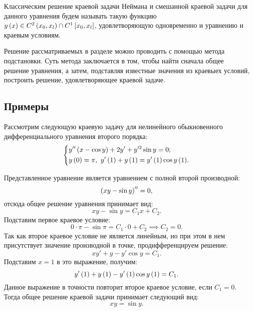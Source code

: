 	Классическим решение краевой задачи Неймана и смешанной краевой задачи для данного уравнения будем называть такую функцию $y \left( x \right) \in C^{2} \left( x_0, x_l \right) \cap C^{1} \left[ x_0, x_l \right]$, удовлетворяющую одновременно и уравнению и краевым условиям.

	Решение рассматриваемых в разделе можно проводить с помощью метода подстановки. Суть метода заключается в том, чтобы найти сначала общее решение уравнения, а затем, подставляя известные значения из краевыех условий, построить решение, удовлетворяющее краевой задаче.

	\subsection{Примеры}

		Рассмотрим следующую краевую задачу для нелинейного обыкновенного дифференциального уравнения второго порядка:
		\[ \left\lbrace \begin{aligned} 
			&y'' \left( x - \cos{y} \right) + 2y' + y'^2 \sin{y} = 0; \\ 
			&y\left( 0 \right) = \pi, ~ y'\left( 1 \right) + y\left( 1 \right) = y'\left( 1 \right) \cos{y \left( 1 \right) }.
		 \end{aligned} \right. \]

		Представленное уравнение является уравнением с полной второй производной:
		\[ \left( xy - \sin{y} \right)'' = 0, \]
		отсюда общее решение уравнения принимает вид:
		\[ xy - \sin{y} = C_1 x + C_2. \]
		Подставим первое краевое условие:
		\[ 0 \cdot \pi - \sin{\pi} = C_1 \cdot 0 + C_2 \implies C_2 = 0. \]
		Так как второе краевое условие не является линейным, но при этом в нем присутствует значение производной в точке, продифференцируем решение:
		\[ xy' + y - y' \cos{y} = C_1. \]
		Подставим $x = 1$ в это выражение, получим:
		\[ y' \left( 1 \right) + y \left( 1 \right) - y' \left( 1 \right) \cos{y \left( 1 \right) } = C_1. \]
		Данное выражение в точности повторит второе краевое условие, если $C_1 = 0$. Тогда общее решение краевой задачи принимает следующий вид:
		\[ xy = \sin{y}. \]


